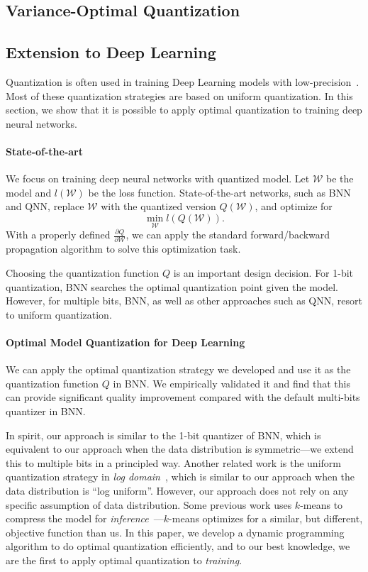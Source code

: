 \documentclass{article}
\begin{document}
\subsection{Variance-Optimal Quantization}



\subsection{Extension to Deep Learning}

Quantization is often used in training 
Deep Learning models with low-precision~\cite{XXX,XXX}.
Most of these quantization strategies
are based on uniform quantization. In this
section, we show that it is possible to
apply optimal quantization to
training deep neural networks.

\paragraph*{State-of-the-art} We focus on
training deep neural networks with quantized
model. Let $\mathcal{W}$ be the model and 
$l(\mathcal{W})$ be the loss function. State-of-the-art networks,
such as BNN and QNN, replace $\mathcal{W}$
with the quantized version $Q(\mathcal{W})$, and optimize
for
\[
\min_{\mathcal{W}} l(Q(\mathcal{W})).
\]
With a properly defined 
$\frac{\partial Q}{\partial{\mathcal{W}}}$, we can
apply the standard forward/backward propagation 
algorithm to solve this optimization task.

Choosing the quantization function $Q$ is
an important design decision. For 1-bit quantization,
BNN searches the optimal quantization point given
the model. However, for multiple bits,
BNN, as well as other approaches such as QNN, resort
to uniform quantization.

\paragraph*{Optimal Model Quantization for Deep Learning}

We can apply the optimal quantization strategy we
developed and use it as the quantization function $Q$
in BNN. We empirically validated it 
and find that this can provide significant quality improvement
compared with the default multi-bits quantizer in BNN. 

In spirit, our approach is similar to the 1-bit quantizer of
BNN, which is equivalent to our approach when the data
distribution is symmetric---we extend this
to multiple bits in a principled way. Another related work
is the uniform quantization strategy 
in {\em log domain}~\cite{miyashita2016convolutional},
which is similar to our approach when the data distribution
is ``log uniform''. However, our approach does not rely on
any specific assumption of data distribution.
Some previous work uses $k$-means to
compress the model for {\em inference}~\cite{XXX}---$k$-means
optimizes for a similar, but different, objective
function than us. In this paper, we 
develop a dynamic
programming algorithm to do optimal quantization efficiently,
and to our best knowledge, we
are the first to apply optimal quantization to
{\em training}.
\end{document}
